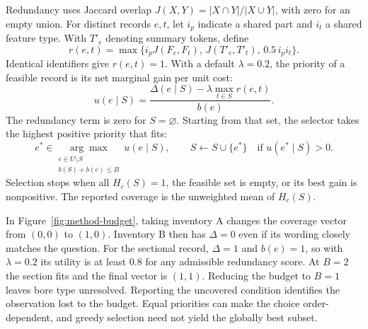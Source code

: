 Redundancy uses Jaccard overlap $J(X,Y)=|X\cap Y|/|X\cup Y|$, with zero for an empty union. For distinct records $e,t$, let $i_p$ indicate a shared part and $i_t$ a shared feature type. With $T'_e$ denoting summary tokens, define
\begin{equation}
 r(e,t)=\max\{i_p J(F_e,F_t),\,J(T'_e,T'_t),\,0.5\,i_p i_t\}.
\end{equation}
Identical identifiers give $r(e,t)=1$. With a default $\lambda=0.2$, the priority of a feasible record is its net marginal gain per unit cost:
\begin{equation}
 u(e\mid S)=
 \frac{\Delta(e\mid S)-\lambda\max_{t\in S}r(e,t)}{b(e)} .
\end{equation}
The redundancy term is zero for $S=\varnothing$. Starting from that set, the selector takes the highest positive priority that fits:
\begin{equation}
 e^* \in \underset{\substack{e\in U\setminus S\\b(S)+b(e)\le B}}{\arg\max}\ u(e\mid S),
 \qquad S\leftarrow S\cup\{e^*\}\quad\text{if }u(e^*\mid S)>0 .
\end{equation}
Selection stops when all $H_c(S)=1$, the feasible set is empty, or its best gain is nonpositive. The reported coverage is the unweighted mean of $H_c(S)$.

In Figure~\ref{fig:method-budget}, taking inventory A changes the coverage vector from $(0,0)$ to $(1,0)$. Inventory B then has $\Delta=0$ even if its wording closely matches the question. For the sectional record, $\Delta=1$ and $b(e)=1$, so with $\lambda=0.2$ its utility is at least $0.8$ for any admissible redundancy score. At $B=2$ the section fits and the final vector is $(1,1)$. Reducing the budget to $B=1$ leaves bore type unresolved. Reporting the uncovered condition identifies the observation lost to the budget. Equal priorities can make the choice order-dependent, and greedy selection need not yield the globally best subset.



